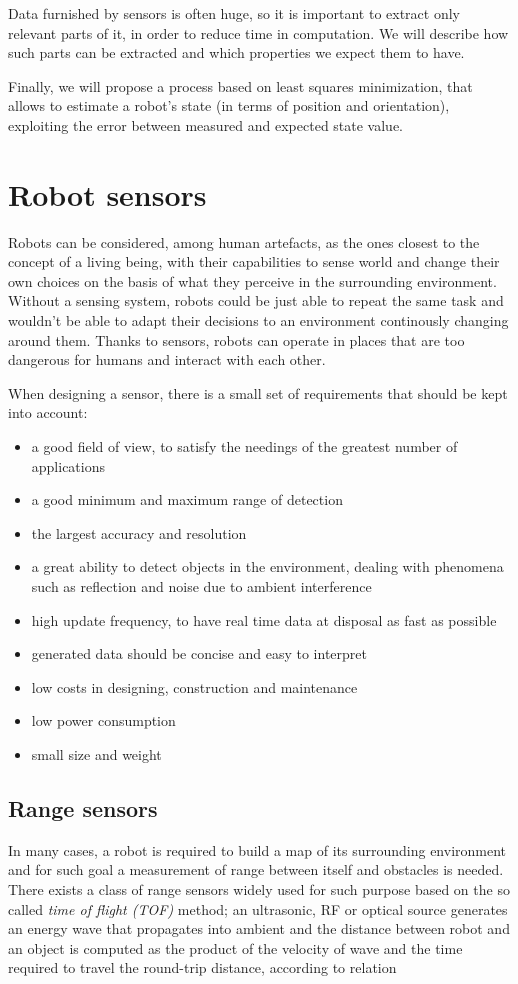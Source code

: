 \documentclass[a4paper, onecolumn]{report}
\begin{document}
Data furnished by sensors is often huge, so it is important to extract only relevant parts of it, in order to reduce time in computation. We will describe how such parts can be extracted and which properties we expect them to have.

Finally, we will propose a process based on least squares minimization, that allows to estimate a robot's state (in terms of position and orientation), exploiting the error between measured and expected state value.

\section{Robot sensors}
Robots can be considered, among human artefacts, as the ones closest to the concept of a living being, with their capabilities to sense world and change their own choices on the basis of what they perceive in the surrounding environment. Without a sensing system, robots could be just able to repeat the same task and wouldn't be able to adapt their decisions to an environment continously changing around them. Thanks to sensors, robots can operate in places that are too dangerous for humans and interact with each other. 

When designing a sensor, there is a small set of requirements that should be kept into account:
\begin{itemize}
\item{a good field of view, to satisfy the needings of the greatest number of applications}
\item{a good minimum and maximum range of detection}
\item{the largest accuracy and resolution}
\item{a great ability to detect objects in the environment, dealing with phenomena such as reflection and noise due to ambient interference}
\item{high update frequency, to have real time data at disposal as fast as possible}
\item{generated data should be concise and easy to interpret}
\item{low costs in designing, construction and maintenance}
\item{low power consumption}
\item{small size and weight}
\end{itemize}

\subsection{Range sensors}
In many cases, a robot is required to build a map of its surrounding environment and for such goal a measurement of range between itself and obstacles is needed.
There exists a class of range sensors widely used for such purpose based on the so called \emph{time of flight (TOF)} method; an ultrasonic, RF or optical source generates an energy wave that propagates into ambient and the distance between robot and an object is computed as the product of the velocity of wave and the time required to travel the round-trip distance, according to relation
\end{document}

